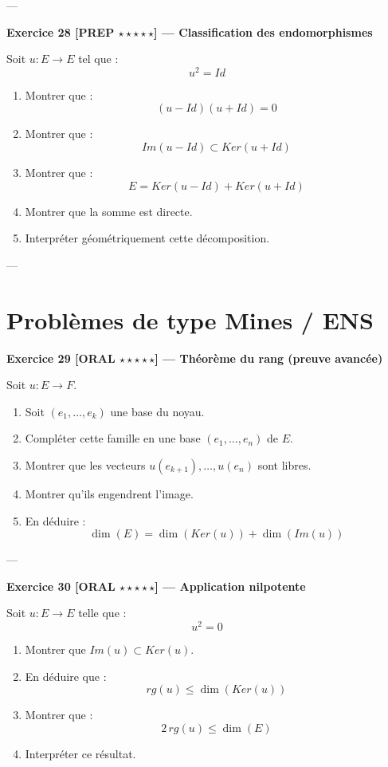 \documentclass[11pt,a4paper]{article}
\begin{document}
---

\textbf{Exercice 28 [PREP $\star\star\star\star\star$] — Classification des endomorphismes}

Soit $u : E \to E$ tel que :
\[
u^2 = Id
\]

\begin{enumerate}
\item Montrer que :
\[
(u - Id)(u + Id) = 0
\]
\item Montrer que :
\[
Im(u - Id) \subset Ker(u + Id)
\]
\item Montrer que :
\[
E = Ker(u - Id) + Ker(u + Id)
\]
\item Montrer que la somme est directe.
\item Interpréter géométriquement cette décomposition.
\end{enumerate}

---

\section{Problèmes de type Mines / ENS}

\textbf{Exercice 29 [ORAL $\star\star\star\star\star$] — Théorème du rang (preuve avancée)}

Soit $u : E \to F$.

\begin{enumerate}
\item Soit $(e_1,\dots,e_k)$ une base du noyau.
\item Compléter cette famille en une base $(e_1,\dots,e_n)$ de $E$.
\item Montrer que les vecteurs $u(e_{k+1}),\dots,u(e_n)$ sont libres.
\item Montrer qu’ils engendrent l’image.
\item En déduire :
\[
\dim(E) = \dim(Ker(u)) + \dim(Im(u))
\]
\end{enumerate}

---

\textbf{Exercice 30 [ORAL $\star\star\star\star\star$] — Application nilpotente}

Soit $u : E \to E$ telle que :
\[
u^2 = 0
\]

\begin{enumerate}
\item Montrer que $Im(u) \subset Ker(u)$.
\item En déduire que :
\[
rg(u) \leq \dim(Ker(u))
\]
\item Montrer que :
\[
2\,rg(u) \leq \dim(E)
\]
\item Interpréter ce résultat.
\end{enumerate}
\end{document}
